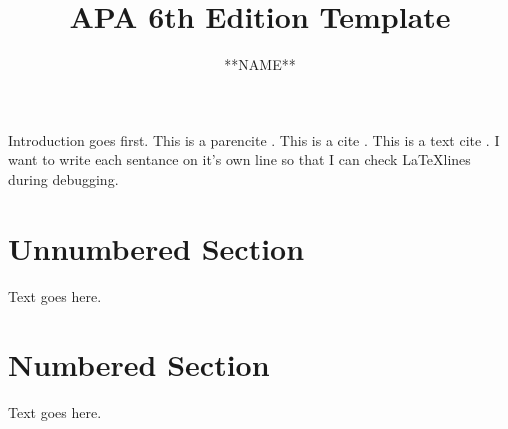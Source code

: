 \documentclass[man,12pt]{apa6}
\title{APA 6th Edition Template}
\author{**NAME**}
\affiliation{**AFIL**}
\begin{document}
\maketitle


Introduction goes first.
This is a parencite \parencite{Test01}. %
This is a cite \cite{Test02}. %
This is a text cite \textcite{Test03}. %
I want to write each sentance on it's own line so that I can check \LaTeX lines during debugging.

\section*{Unnumbered Section}

Text goes here.

\section{Numbered Section} %

Text goes here.

\printbibliography
\end{document}
